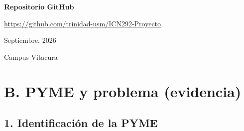 \documentclass[10pt,a4paper]{article}
\begin{document}
\begin{titlepage}
\begin{center}
\begin{center}
\begin{tabular}{p{3.2cm}p{2.8cm}p{5.2cm}p{3.2cm}}
\end{tabular}
\end{center}

\vfill

\begin{center}

{\small\bfseries Repositorio GitHub\par}

\vspace{0.1cm}

{\small
\url{https://github.com/trinidad-usm/ICN292-Proyecto}
\par}

\vspace{0.5cm}

{\small Septiembre, 2026\par}

\vspace{0.5cm}

{\small Campus Vitacura\par}

\end{center}

\end{center}

\end{titlepage}
\raggedright




\section*{B. PYME y problema (evidencia)}

\subsection*{1. Identificación de la PYME}
\end{document}
